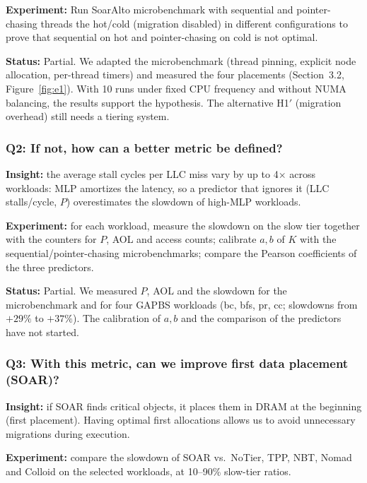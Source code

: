 \documentclass[10pt,a4paper]{article}
\begin{document}
\textbf{Experiment:} Run SoarAlto microbenchmark with sequential and pointer-chasing threads the hot/cold (migration disabled) in different configurations to prove that sequential on hot and pointer-chasing on cold is not optimal. 

\textbf{Status:} Partial. We adapted the microbenchmark (thread pinning, explicit node allocation, per-thread timers) and measured the four placements (Section~3.2, Figure~\ref{fig:e1}). With 10 runs under fixed CPU frequency and without NUMA balancing, the results support the hypothesis. The alternative H1$'$ (migration overhead) still needs a tiering system.



\subsubsection{Q2: If not, how can a better metric be defined?}

\textbf{Insight:} the average stall cycles per LLC miss vary by
        up to 4$\times$ across workloads: MLP amortizes
        the latency, so a predictor that ignores it (LLC stalls/cycle, $P$)
        overestimates the slowdown of high-MLP workloads.

\textbf{Experiment:} for each workload, measure the slowdown on the
        slow tier together with the counters for $P$, AOL and access counts;
        calibrate $a,b$ of $K$ with the sequential/pointer-chasing
        microbenchmarks; compare the Pearson coefficients of the three
        predictors.

\textbf{Status:} Partial. We measured $P$, AOL and the slowdown for the microbenchmark and for four GAPBS workloads (bc, bfs, pr, cc; slowdowns from $+29\%$ to $+37\%$). The calibration of $a, b$ and the comparison of the predictors have not started.



\subsubsection{Q3: With this metric, can we improve first data placement (SOAR)?}

\textbf{Insight:} if SOAR finds critical
        objects, it places them in DRAM at the beginning (first placement).
        Having optimal first allocations allows us to avoid unnecessary migrations during execution.

\textbf{Experiment:} compare the slowdown of SOAR vs.\ NoTier, TPP,
        NBT, Nomad and Colloid on the selected workloads, at 10--90\%
        slow-tier ratios.
\end{document}
